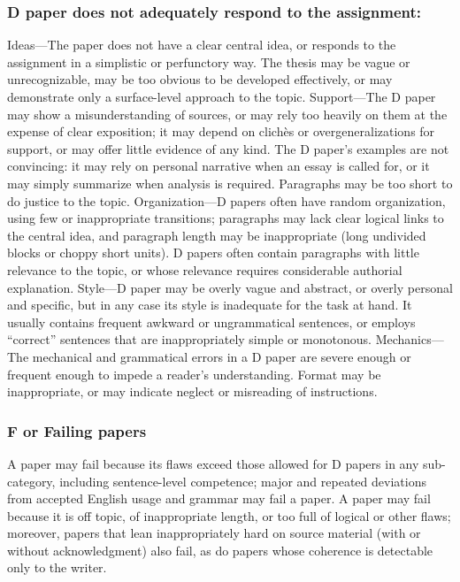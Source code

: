 \documentclass{article}
\begin{document}
\subsubsection{D paper does not adequately respond to the assignment:}
Ideas---The paper does not have a clear central idea, or responds to the assignment in a simplistic or perfunctory way. The thesis may be vague or unrecognizable, may be too obvious to be developed effectively, or may demonstrate only a surface-level approach to the topic. Support---The D paper may show a misunderstanding of sources, or may rely too heavily on them at the expense of clear exposition; it may depend on clich\`es or overgeneralizations for support, or may offer little evidence of any kind. The D paper's examples are not convincing: it may rely on personal narrative when an essay is called for, or it may simply summarize when analysis is required. Paragraphs may be too short to do justice to the topic. Organization---D papers often have random organization, using few or inappropriate transitions; paragraphs may lack clear logical links to the central idea, and paragraph length may be inappropriate (long undivided blocks or choppy short units). D papers often contain paragraphs with little relevance to the topic, or whose relevance requires considerable authorial explanation. Style---D paper may be overly vague and abstract, or overly personal and specific, but in any case its style is inadequate for the task at hand. It usually contains frequent awkward or ungrammatical sentences, or employs ``correct'' sentences that are inappropriately simple or monotonous. Mechanics---The mechanical and grammatical errors in a D paper are severe enough or frequent enough to impede a reader's understanding. Format may be inappropriate, or may indicate neglect or misreading of instructions.

\subsubsection{F or Failing papers}
A paper may fail because its flaws exceed those allowed for D papers in any sub-category, including sentence-level competence; major and repeated deviations from accepted English usage and grammar may fail a paper. A paper may fail because it is off topic, of inappropriate length, or too full of logical or other flaws; moreover, papers that lean inappropriately hard on source material (with or without acknowledgment) also fail, as do papers whose coherence is detectable only to the writer.
\end{document}
